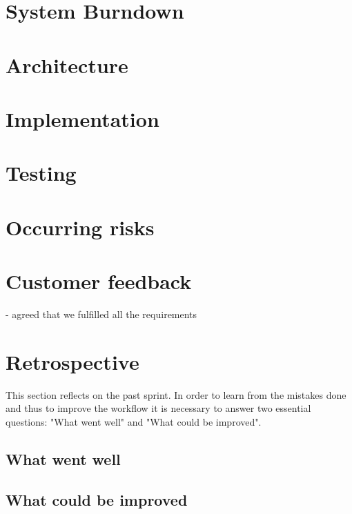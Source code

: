 \section{System Burndown}

\section{Architecture}
\section{Implementation}
\section{Testing}
\section{Occurring risks}
\section{Customer feedback}
- agreed that we fulfilled all the requirements

\section{Retrospective}
This section reflects on the past sprint. In order to learn from the mistakes done and thus to improve the workflow it is necessary to answer two essential questions: "What went well" and "What could be improved".

\subsection{What went well}
\subsection{What could be improved}
